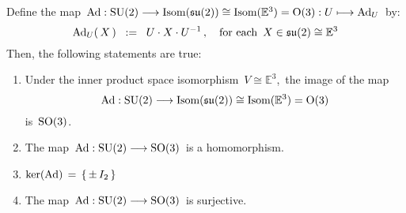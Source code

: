 \vskip 0.5cm
\noindent
\begin{proposition}
\mbox{}
\vskip 0.05cm
\noindent
Define the map
\,$\textnormal{Ad} : \textnormal{SU}(2) \longrightarrow \textnormal{Isom}(\mathfrak{su}(2)) \cong \textnormal{Isom}(\mathbb{E}^{3}) = \textnormal{O}(3) : U \longmapsto \textnormal{Ad}_{U}$\,
by:
\begin{equation*}
\textnormal{Ad}_{U}(\,X\,)
\;\; := \;\;
	U \cdot X \cdot U^{-1}\,,
\quad
\textnormal{for each \,$X \in \mathfrak{su}(2) \cong \mathbb{E}^{3}$}
\end{equation*}
Then, the following statements are true:
\begin{enumerate}
\item
	Under the inner product space isomorphism
	\,$V \cong \mathbb{E}^{3}$,\,
	the image of the map
	\begin{equation*}
	\textnormal{Ad} : \textnormal{SU}(2) \longrightarrow \textnormal{Isom}(\mathfrak{su}(2)) \cong \textnormal{Isom}(\mathbb{E}^{3}) = \textnormal{O}(3)
	\end{equation*}
	is \,$\textnormal{SO}(3)$.\,
\item
	The map \,$\textnormal{Ad} : \textnormal{SU}(2) \longrightarrow \textnormal{SO}(3)$\, is a homomorphism.
\item
	$\ker(\textnormal{Ad}) \, = \, \{\,\pm \, I_{2}\,\}$
\item
	The map \,$\textnormal{Ad} : \textnormal{SU}(2) \longrightarrow \textnormal{SO}(3)$\, is surjective.
\end{enumerate}
\end{proposition}
\proof
